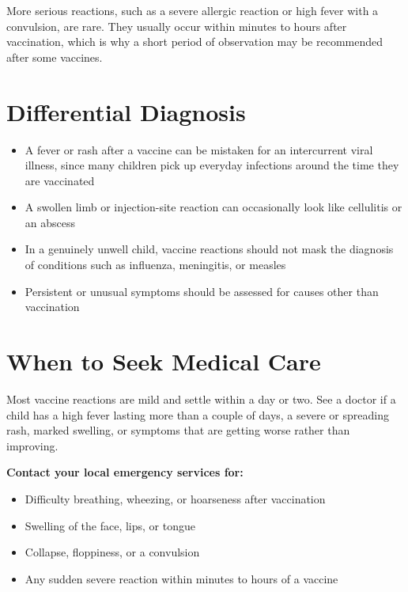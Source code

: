\medskip
More serious reactions, such as a severe allergic reaction or high fever with a convulsion, are rare. They usually occur within minutes to hours after vaccination, which is why a short period of observation may be recommended after some vaccines.

\section*{Differential Diagnosis}
\begin{itemize}
    \item A fever or rash after a vaccine can be mistaken for an intercurrent viral illness, since many children pick up everyday infections around the time they are vaccinated
    \item A swollen limb or injection-site reaction can occasionally look like cellulitis or an abscess
    \item In a genuinely unwell child, vaccine reactions should not mask the diagnosis of conditions such as influenza, meningitis, or measles
    \item Persistent or unusual symptoms should be assessed for causes other than vaccination
\end{itemize}

\section*{When to Seek Medical Care}
Most vaccine reactions are mild and settle within a day or two. See a doctor if a child has a high fever lasting more than a couple of days, a severe or spreading rash, marked swelling, or symptoms that are getting worse rather than improving.

\medskip
\textbf{Contact your local emergency services for:}
\begin{itemize}
    \item Difficulty breathing, wheezing, or hoarseness after vaccination
    \item Swelling of the face, lips, or tongue
    \item Collapse, floppiness, or a convulsion
    \item Any sudden severe reaction within minutes to hours of a vaccine
\end{itemize}

